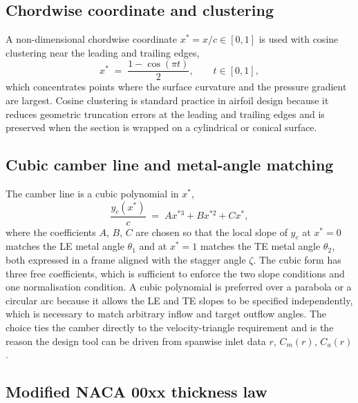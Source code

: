 \subsection{Chordwise coordinate and clustering}
\label{sec:theory_clustering}
 
A non-dimensional chordwise coordinate $x^* = x/c \in [0, 1]$ is used with cosine clustering near the leading and trailing edges,
\begin{equation}
x^* \;=\; \frac{1 - \cos(\pi t)}{2}, \qquad t \in [0, 1],
\label{eq:cosine_clustering}
\end{equation}
which concentrates points where the surface curvature and the pressure gradient are largest. Cosine clustering is standard practice in airfoil design because it reduces geometric truncation errors at the leading and trailing edges and is preserved when the section is wrapped on a cylindrical or conical surface.
 
\subsection{Cubic camber line and metal-angle matching}
\label{sec:theory_camber}
 
The camber line is a cubic polynomial in $x^*$,
\begin{equation}
\frac{y_c(x^*)}{c} \;=\; A x^{*3} + B x^{*2} + C x^*,
\label{eq:camber_cubic}
\end{equation}
where the coefficients $A$, $B$, $C$ are chosen so that the local slope of $y_c$ at $x^* = 0$ matches the LE metal angle $\theta_1$ and at $x^* = 1$ matches the TE metal angle $\theta_2$, both expressed in a frame aligned with the stagger angle $\zeta$. The cubic form has three free coefficients, which is sufficient to enforce the two slope conditions and one normalisation condition. A cubic polynomial is preferred over a parabola or a circular arc because it allows the LE and TE slopes to be specified independently, which is necessary to match arbitrary inflow and target outflow angles. The choice ties the camber directly to the velocity-triangle requirement and is the reason the design tool can be driven from spanwise inlet data $r$, $C_m(r)$, $C_u(r)$.
 
\subsection{Modified NACA 00xx thickness law}
\label{sec:theory_thickness}
 
